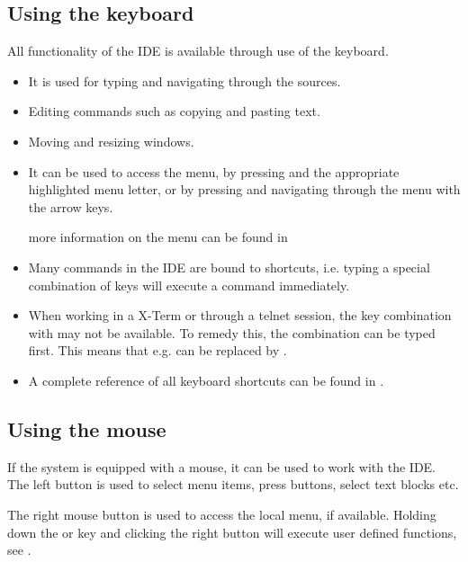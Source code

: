 \subsection{Using the keyboard}
All functionality of the IDE is available through use of the keyboard.
\begin{itemize}
\item It is used for typing and navigating through the sources.
\item Editing commands such as copying and pasting text.
\item Moving and resizing windows.
\item It can be used to access the menu, by pressing  and the
appropriate highlighted menu letter, or by pressing  and
navigating through the menu with the arrow keys.

more information on the menu can be found in 
\item Many commands in the IDE are bound to shortcuts, i.e. typing a special
combination of keys will execute a command immediately.
\end{itemize}
\begin{remark}
\begin{itemize}
\item When working in a \linux X-Term or through a telnet session, the
key combination with  may not be available. To remedy this, the
 combination can be typed first. This means that e.g. 
can be replaced by .
\item A complete reference of all keyboard shortcuts can be found in
.
\end{itemize}
\end{remark}
%
%
\subsection{Using the mouse}
\label{suse:mouseusage}
If the system is equipped with a mouse, it can be used to work with the
IDE. The left button is used to select menu items, press buttons, select
text blocks etc.

The right mouse button is used to access the local menu, if available.
Holding down the  or  key and clicking the right
button will execute user defined functions,  see .

